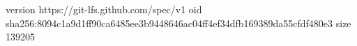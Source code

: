 version https://git-lfs.github.com/spec/v1
oid sha256:8094c1a9d1ff90ca6485ee3b9448646ac04ff4ef34dfb169389da55cfdf480e3
size 139205
